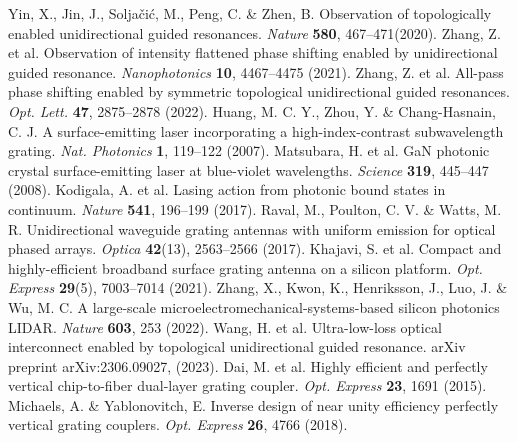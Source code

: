 \documentclass[%
 reprint,
superscriptaddress,
 amsmath,amssymb, aps,
]{revtex4-1}
\begin{document}
\begin{thebibliography}{1}
 Yin, X., Jin, J., Solja\v{c}i\'{c}, M., Peng, C. \& Zhen, B. Observation of topologically enabled unidirectional guided resonances. \emph{Nature} {\bf 580}, 467--471(2020).
 Zhang, Z. et al. Observation of intensity flattened phase shifting enabled by unidirectional guided resonance. \emph{Nanophotonics} {\bf 10}, 4467--4475 (2021).
 Zhang, Z. et al. All-pass phase shifting enabled by symmetric topological unidirectional guided resonances. \emph{Opt. Lett.} {\bf 47}, 2875--2878 (2022).
 Huang, M. C. Y., Zhou, Y. \& Chang-Hasnain, C. J. A surface-emitting laser incorporating a high-index-contrast subwavelength grating. \emph{Nat. Photonics} {\bf 1}, 119--122 (2007).
 Matsubara, H. et al. GaN photonic crystal surface-emitting laser at blue-violet wavelengths. \emph{Science} {\bf 319}, 445--447 (2008).
 Kodigala, A. et al. Lasing action from photonic bound states in continuum. \emph{Nature} {\bf 541}, 196--199 (2017).
 Raval, M., Poulton, C. V. \& Watts, M. R. Unidirectional waveguide grating antennas with uniform emission for optical phased arrays. \emph{Optica} {\bf 42}(13), 2563--2566 (2017).
 Khajavi, S. et al. Compact and highly-efficient broadband surface grating antenna on a silicon platform. \emph{Opt. Express} {\bf 29}(5), 7003--7014 (2021).
 Zhang, X., Kwon, K., Henriksson, J., Luo, J. \& Wu, M. C. A large-scale microelectromechanical-systems-based silicon photonics LIDAR. \emph{Nature} {\bf 603}, 253 (2022).
 Wang, H. et al. Ultra-low-loss optical interconnect enabled by topological unidirectional guided resonance. arXiv preprint arXiv:2306.09027, (2023).
 Dai, M. et al. Highly efficient and perfectly vertical chip-to-fiber dual-layer grating coupler. \emph{Opt. Express} {\bf 23}, 1691 (2015).
 Michaels, A. \& Yablonovitch, E. Inverse design of near unity efficiency perfectly vertical grating couplers. \emph{Opt. Express} {\bf 26}, 4766 (2018).

\end{thebibliography}
\end{document}

